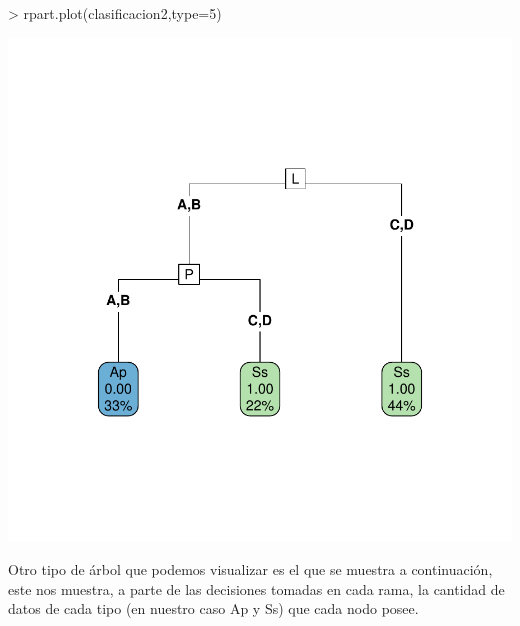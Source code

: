 \documentclass [a4paper] {article}
\begin{document}
\begin{Schunk}
\begin{Sinput}
> rpart.plot(clasificacion2,type=5)
\end{Sinput}
\end{Schunk}
\includegraphics{Memoria-Figura 2}

\newpage
Otro tipo de árbol que podemos visualizar es el que se muestra a continuación, este nos muestra, a parte
de las decisiones tomadas en cada rama, la cantidad de datos de cada tipo (en nuestro caso Ap y Ss)
que cada nodo posee.
\end{document}
